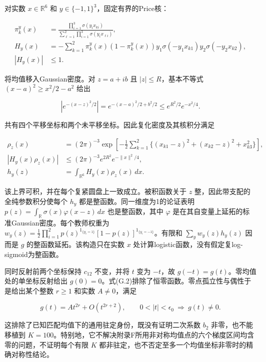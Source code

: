 \documentclass[11pt,a4paper]{article}
\begin{document}
对实数 \(x\in\mathbb R^6\) 和 \(y\in\{-1,1\}^3\)，固定有界的Price核：

\[
\begin{aligned}
\pi_k^y(x)&=\frac{\prod_{i=1}^3\sigma(y_ix_{ki})}
{\sum_{\ell=1}^2\prod_{i=1}^3\sigma(y_ix_{\ell i})},\\
H_y(x)&=-\sum_{k=1}^2\pi_k^y(x)(1-\pi_k^y(x))
y_1\sigma(-y_1x_{k1})y_2\sigma(-y_2x_{k2}),\\
|H_y(x)|&\le1.
\end{aligned}
\tag{G.12}
\]

将均值移入Gaussian密度。对 \(z=a+ib\) 且 \(|z|\le R\)，基本不等式
\((x-a)^2\ge x^2/2-a^2\) 给出

\[
\left|e^{-(x-z)^2/2}\right|
=e^{-(x-a)^2/2+b^2/2}
\le e^{R^2/2}e^{-x^2/4}.
\tag{G.13}
\]

共有四个平移坐标和两个未平移坐标。因此复化密度及其核积分满足

\[
\begin{aligned}
\rho_z(x)&=(2\pi)^{-3}\exp\left[-\frac12\sum_{k=1}^2
\{(x_{k1}-z)^2+(x_{k2}-z)^2+x_{k3}^2\}\right],\\
|H_y(x)\rho_z(x)|&\le(2\pi)^{-3}e^{2R^2}e^{-\|x\|^2/4},\\
h_y(z)&=\int_{\mathbb R^6}H_y(x)\rho_z(x)\,dx.
\end{aligned}
\tag{G.14}
\]

该上界可积，并在每个复紧圆盘上一致成立。被积函数关于 \(z\)
整，因此带支配的全纯参数积分使每个 \(h_y\)
都是整函数。同一维度为1的论证表明
\(p(z)=\int_{\mathbb R}\sigma(x)\varphi(x-z)\,dx\) 也是整函数，其中
\(\varphi\) 是在其自变量上延拓的标准Gaussian密度。每个教师权重为
\(w_y(z)=\tfrac12\prod_{i=1}^2p(z)^{1_{\{y_i=1\}}}[1-p(z)]^{1_{\{y_i=-1\}}}\)。有限和
\(\sum_yw_y(z)h_y(z)\) 因而是 \(g\) 的整函数延拓。该构造只在实数 \(x\)
处计算logistic函数，没有假定复log-sigmoid为整函数。

同时反射前两个坐标保持 \(c_{12}\) 不变，并将 \(t\) 变为 \(-t\)，故
\(g(-t)=g(t)\)。零均值处的单坐标反射给出
\(g(0)=0\)。式(G.2)排除了恒零函数。零点孤立性与偶性于是给出某个整数
\(r\ge1\) 和实数 \(A\ne0\)，满足

\[
g(t)=At^{2r}+O(t^{2r+2}),\qquad
0<|t|<\epsilon_0\ \Longrightarrow\ g(t)\ne0.
\tag{G.15}
\]

这排除了已知匹配均值下的通用驻定身份，既没有证明二次系数 \(b_2\)
非零，也不能移植到
\(K=100\)。特别地，它不解决附录F所用非对称均值点的六个梯度区间均含零的问题，不证明每个有限
\(K\) 都非驻定，也不否定至多一个均值坐标非零时的精确对称性结论。

\clearpage
\end{document}
